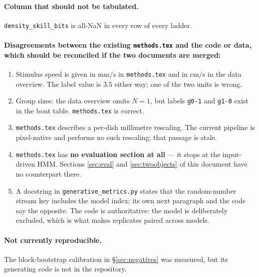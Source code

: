 \documentclass[11pt,a4paper]{article}
\newcommand{\unit}[1]{\ensuremath{\mathrm{#1}}}   %
\newcommand{\code}[1]{\texttt{\small #1}}
\begin{document}
\paragraph{Column that should not be tabulated.} \code{density\_skill\_bits} is all-NaN in
every row of every ladder.

\paragraph{Disagreements between the existing \texttt{methods.tex} and the code or data,
which should be reconciled if the two documents are merged:}
\begin{enumerate}\itemsep2pt
\item Stimulus speed is given in \unit{mm/s} in \code{methods.tex} and in
      \unit{cm/s} in the data overview. The label value is $3.5$ either
      way; one of the two units is wrong.
\item Group sizes: the data overview omits $N=1$, but labels \code{g0-1} and \code{g1-0}
      exist in the bout table. \code{methods.tex} is correct.
\item \code{methods.tex} describes a per-dish millimetre rescaling. The current pipeline is
      pixel-native and performs no such rescaling; that passage is stale.
\item \code{methods.tex} has \textbf{no evaluation section at all} --- it stops at the
      input-driven HMM. Sections \ref{sec:eval} and \ref{sec:twoobjects} of this document
      have no counterpart there.
\item A docstring in \code{generative\_metrics.py} states that the random-number stream key
      includes the model index; its own next paragraph and the code say the opposite. The
      code is authoritative: the model is deliberately excluded, which is what makes
      replicates paired across models.
\end{enumerate}

\paragraph{Not currently reproducible.} The block-bootstrap calibration in
\S\ref{sec:negatives} was measured, but its generating code is not in the repository.
\end{document}
